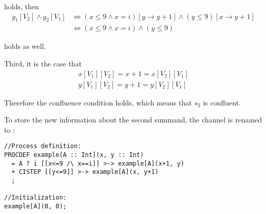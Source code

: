 holds, then
\begin{align*}
g_1[V_2] \land g_2[V_1] &\Leftrightarrow (x \leq 9 \land x=i)[ y \rightarrow y+1 ] \land (y \leq 9)[ x \rightarrow y+1 ] \\
&\Leftrightarrow (x \leq 9 \land x=i) \land (y \leq 9)
\end{align*}

holds as well.

Third, it is the case that
\begin{align*}
x[V_1][V_2] = x+1 = x[V_2][V_1] \\
y[V_1][V_2] = y+1 = y[V_2][V_1]
\end{align*}

Therefore the confluence condition holds, which means that $s_2$ is confluent.

To store the new information about the second summand, the channel is renamed to \cistep{}:

\begin{lstlisting}
//Process definition:
PROCDEF example[A :: Int](x, y :: Int)
  = A ? i [[x<=9 /\ x==i]] >-> example[A](x+1, y)
  + CISTEP [[y<=9]] >-> example[A](x, y+1)
  ;

//Initialization:
example[A](0, 0);
\end{lstlisting}

